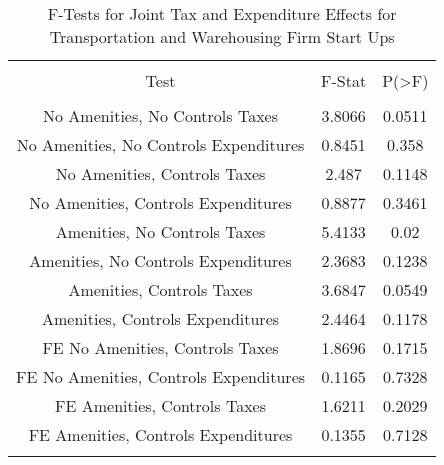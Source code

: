 
\begin{table}[!htbp] \centering 
  \caption{F-Tests for Joint Tax and Expenditure Effects for Transportation and Warehousing Firm Start Ups} 
  \label{48-49Ftests} 
\begin{tabular}{@{\extracolsep{5pt}} ccc} 
\\[-1.8ex]\hline 
\hline \\[-1.8ex] 
Test & F-Stat & P(\textgreater F) \\ 
\hline \\[-1.8ex] 
No Amenities, No Controls Taxes & 3.8066 & 0.0511 \\ 
No Amenities, No Controls Expenditures & 0.8451 & 0.358 \\ 
No Amenities, Controls Taxes & 2.487 & 0.1148 \\ 
No Amenities, Controls Expenditures & 0.8877 & 0.3461 \\ 
Amenities, No Controls Taxes & 5.4133 & 0.02 \\ 
Amenities, No Controls Expenditures & 2.3683 & 0.1238 \\ 
Amenities, Controls Taxes & 3.6847 & 0.0549 \\ 
Amenities, Controls Expenditures & 2.4464 & 0.1178 \\ 
FE No Amenities, Controls Taxes & 1.8696 & 0.1715 \\ 
FE No Amenities, Controls Expenditures & 0.1165 & 0.7328 \\ 
FE Amenities, Controls Taxes & 1.6211 & 0.2029 \\ 
FE Amenities, Controls Expenditures & 0.1355 & 0.7128 \\ 
\hline \\[-1.8ex] 
\end{tabular} 
\end{table} 
